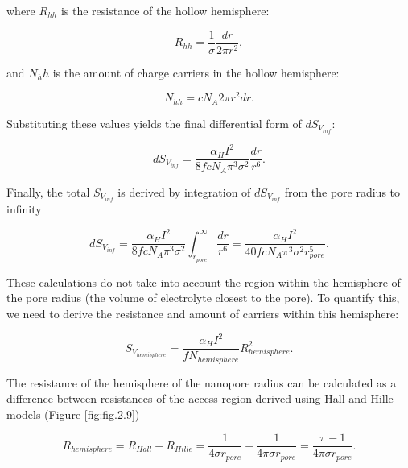 \noindent where $R_{hh}$ is the resistance of the hollow hemisphere:

\begin{equation}\label{eqn:Eq2.34}
R_{hh}=\frac{1}{\sigma}\frac{dr}{2\pi r^2},
\end{equation}

\noindent and $N_hh$ is the amount of charge carriers in the hollow hemisphere:

\begin{equation}\label{eqn:Eq2.35}
N_{hh}=cN_A2\pi r^2dr.
\end{equation}
        
\noindent Substituting these values yields the final differential form of $dS_{V_{inf}}$:

\begin{equation}\label{eqn:Eq2.36}
dS_{V_{inf}}=\frac{\alpha_HI^2}{8fcN_A\pi^3 \sigma^2 }\frac{dr}{r^6}.
\end{equation}


\noindent Finally, the total $S_{V_{inf}}$ is derived by integration of $dS_{V_{inf}}$ from the pore radius to infinity

\begin{equation}\label{eqn:Eq2.37}
dS_{V_{inf}}=\frac{\alpha_HI^2}{8fcN_A\pi^3 \sigma^2 }\int_{r_{pore}}^{\infty}\frac{dr}{r^6}=\frac{\alpha_HI^2}{40fcN_A\pi^3 \sigma^2 r_{pore}^5}.
\end{equation}
                                   
\noindent These calculations do not take into account the region within the hemisphere of the pore radius (the volume of electrolyte closest to the pore). To quantify this, we need to derive the resistance and amount of carriers within this hemisphere:

\begin{equation}\label{eqn:Eq2.38}
S_{V_{hemisphere}}=\frac{\alpha_HI^2}{fN_{hemisphere}}R_{hemisphere}^2.
\end{equation} 

\noindent The resistance of the hemisphere of the nanopore radius can be calculated as a difference between resistances of the access region derived using Hall \cite{Hall1975}and Hille \cite{Hille1968} models (Figure \ref{fig:fig.2.9})

\begin{equation}\label{eqn:Eq2.39}
R_{hemisphere}=R_{Hall}-R_{Hille}=\frac{1}{4\sigma r_{pore}}-\frac{1}{4\pi \sigma r_{pore}}=\frac{\pi-1}{4\pi\sigma r_{pore}}.
\end{equation}               

